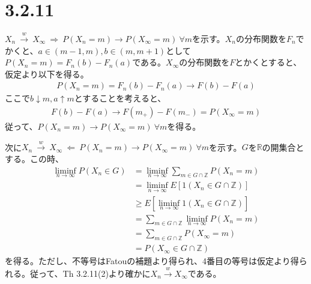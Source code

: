 \documentclass{article}
\begin{document}
\section{3.2.11}
$X_n\ \xrightarrow{w}\ X_{\infty}\ \Rightarrow\ P\left( X_n = m \right) \to P\left( X_{\infty} = m \right)\ \forall m$を示す。$X_n$の分布関数を$F_n$でかくと、$a \in (m-1, m), b \in (m, m+1)$として$P\left( X_n = m \right) = F_n(b) - F_n(a)$である。$X_{\infty}$の分布関数を$F$とかくとすると、仮定より以下を得る。
\begin{align*}
	P\left( X_n = m \right) = F_n(b) - F_n(a) \to F(b) - F(a)
\end{align*}
ここで$b\downarrow m, a\uparrow m$とすることを考えると、
\begin{align*}
	F(b) - F(a) \to F(m_{+}) - F(m_{-}) = P\left( X_{\infty} = m\right)
\end{align*}
従って、$P\left( X_n = m \right) \to P\left( X_{\infty} = m \right)\ \forall m$を得る。

次に$X_n\ \xrightarrow{w}\ X_{\infty}\ \Leftarrow\ P\left( X_n = m \right) \to P\left( X_{\infty} = m \right)\ \forall m$を示す。$G$を$\mathbb{R}$の開集合とする。この時、
\begin{align*}
	\liminf_{n\to \infty} P\left( X_n \in G \right) &= \liminf_{n\to \infty} \sum_{m \in G \cap \mathbb{Z}} P\left( X_n = m \right)\\
	&= \liminf_{n\to \infty} E\left[ 1\left( X_n \in G\cap \mathbb{Z} \right) \right]\\
	&\geq E\left[ \liminf_{n\to \infty} 1\left( X_n \in G\cap \mathbb{Z} \right) \right]\\
	&= \sum_{m \in G \cap \mathbb{Z}} \liminf_{n\to \infty} P\left( X_n = m \right)\\
	&= \sum_{m \in G \cap \mathbb{Z}} P\left( X_{\infty} = m \right)\\
	&= P\left( X_{\infty} \in G\cap \mathbb{Z} \right)
\end{align*}
を得る。ただし、不等号はFatouの補題より得られ、4番目の等号は仮定より得られる。従って、Th 3.2.11(2)より確かに$X_n \xrightarrow{w} X_{\infty}$である。
\end{document}
